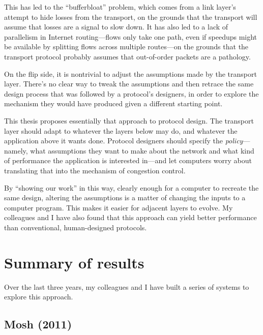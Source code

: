 This has led to the ``bufferbloat''\cite{bufferbloat} problem, which
comes from a link layer's attempt to hide losses from the transport,
on the grounds that the transport will assume that losses are a signal
to slow down. It has also led to a lack of parallelism in Internet
routing---flows only take one path, even if speedups might be
available by splitting flows across multiple routes---on the grounds
that the transport protocol probably assumes that out-of-order packets
are a pathology.

On the flip side, it is nontrivial to adjust the assumptions made by
the transport layer. There's no clear way to tweak the assumptions and
then retrace the same design process that was followed by a protocol's
designers, in order to explore the mechanism they would have produced
given a different starting point.


This thesis proposes essentially that approach to protocol design. The
transport layer should adapt to whatever the layers below may do, and
whatever the application above it wants done. Protocol designers
should specify the \emph{policy}---namely, what assumptions they want
to make about the network and what kind of performance the application
is interested in---and let computers worry about translating that into
the mechanism of congestion control.

By ``showing our work'' in this way, clearly enough for a computer to
recreate the same design, altering the assumptions is a matter of
changing the inputs to a computer program. This makes it easier for
adjacent layers to evolve. My colleagues and I have also found that
this approach can yield better performance than conventional,
human-designed protocols.

\section{Summary of results}

Over the last three years, my colleagues and I have built a series of
systems to explore this approach.

\subsection{Mosh (2011)}

